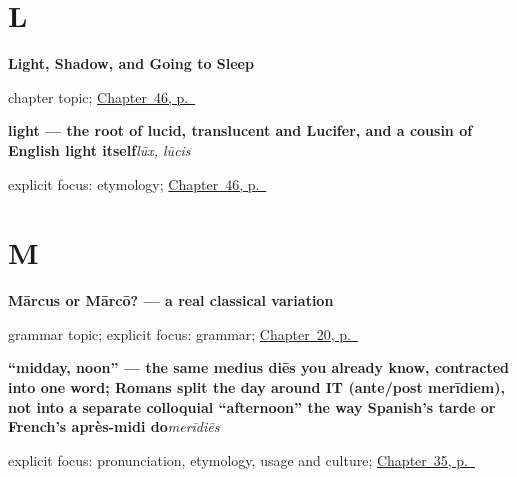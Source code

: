 \section*{L}

\noindent\begin{minipage}[t]{\linewidth}
\raggedright
\textbf{Light, Shadow, and Going to Sleep}\par
\footnotesize chapter topic; \hyperref[ch:la-lux]{Chapter~46, p.~\pageref*{ch:la-lux}}
\end{minipage}\par\smallskip

\noindent\begin{minipage}[t]{\linewidth}
\raggedright
\textbf{light — the root of lucid, translucent and Lucifer, and a cousin of English light itself}\enspace\emph{lūx, lūcis}\par
\footnotesize explicit focus: etymology; \hyperref[ch:la-lux]{Chapter~46, p.~\pageref*{ch:la-lux}}
\end{minipage}\par\smallskip

\section*{M}

\noindent\begin{minipage}[t]{\linewidth}
\raggedright
\textbf{Mārcus or Mārcō? — a real classical variation}\par
\footnotesize grammar topic; explicit focus: grammar; \hyperref[ch:la-exchanging-names]{Chapter~20, p.~\pageref*{ch:la-exchanging-names}}
\end{minipage}\par\smallskip

\noindent\begin{minipage}[t]{\linewidth}
\raggedright
\textbf{\textquotedblleft{}midday, noon\textquotedblright{} — the same medius diēs you already know, contracted into one word; Romans split the day around IT (ante/post merīdiem), not into a separate colloquial \textquotedblleft{}afternoon\textquotedblright{} the way Spanish's tarde or French's après-midi do}\enspace\emph{merīdiēs}\par
\footnotesize explicit focus: pronunciation, etymology, usage and culture; \hyperref[ch:la-noon-and-afternoon]{Chapter~35, p.~\pageref*{ch:la-noon-and-afternoon}}
\end{minipage}\par\smallskip

